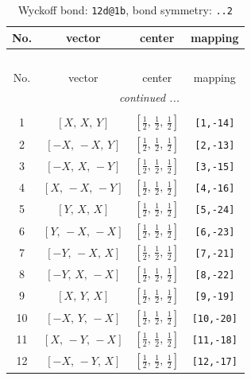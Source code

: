 \documentclass[fleqn,8pt]{jsarticle}
\begin{document}
\begin{longtable}{cccc}
\caption{Wyckoff bond: {\tt 12d@1b}, bond symmetry: {\tt ..2}}
 \\
 \hline \hline
No. & vector & center & mapping \\ \hline \endfirsthead

\multicolumn{3}{l}{\tablename\ \thetable{}} \\
 \hline \hline
No. & vector & center & mapping \\ \hline \endhead

 \hline \hline
\multicolumn{3}{r}{\footnotesize\it continued ...} \\ \endfoot

 \hline \hline
\multicolumn{3}{r}{} \\ \endlastfoot

1 & $\left[ X,\, X,\, Y \right]$ & $\left[ \frac{1}{2},\, \frac{1}{2},\, \frac{1}{2} \right]$ & {\tt [1,-14]} \\ \hline
2 & $\left[ - X,\, - X,\, Y \right]$ & $\left[ \frac{1}{2},\, \frac{1}{2},\, \frac{1}{2} \right]$ & {\tt [2,-13]} \\ \hline
3 & $\left[ - X,\, X,\, - Y \right]$ & $\left[ \frac{1}{2},\, \frac{1}{2},\, \frac{1}{2} \right]$ & {\tt [3,-15]} \\ \hline
4 & $\left[ X,\, - X,\, - Y \right]$ & $\left[ \frac{1}{2},\, \frac{1}{2},\, \frac{1}{2} \right]$ & {\tt [4,-16]} \\ \hline
5 & $\left[ Y,\, X,\, X \right]$ & $\left[ \frac{1}{2},\, \frac{1}{2},\, \frac{1}{2} \right]$ & {\tt [5,-24]} \\ \hline
6 & $\left[ Y,\, - X,\, - X \right]$ & $\left[ \frac{1}{2},\, \frac{1}{2},\, \frac{1}{2} \right]$ & {\tt [6,-23]} \\ \hline
7 & $\left[ - Y,\, - X,\, X \right]$ & $\left[ \frac{1}{2},\, \frac{1}{2},\, \frac{1}{2} \right]$ & {\tt [7,-21]} \\ \hline
8 & $\left[ - Y,\, X,\, - X \right]$ & $\left[ \frac{1}{2},\, \frac{1}{2},\, \frac{1}{2} \right]$ & {\tt [8,-22]} \\ \hline
9 & $\left[ X,\, Y,\, X \right]$ & $\left[ \frac{1}{2},\, \frac{1}{2},\, \frac{1}{2} \right]$ & {\tt [9,-19]} \\ \hline
10 & $\left[ - X,\, Y,\, - X \right]$ & $\left[ \frac{1}{2},\, \frac{1}{2},\, \frac{1}{2} \right]$ & {\tt [10,-20]} \\ \hline
11 & $\left[ X,\, - Y,\, - X \right]$ & $\left[ \frac{1}{2},\, \frac{1}{2},\, \frac{1}{2} \right]$ & {\tt [11,-18]} \\ \hline
12 & $\left[ - X,\, - Y,\, X \right]$ & $\left[ \frac{1}{2},\, \frac{1}{2},\, \frac{1}{2} \right]$ & {\tt [12,-17]} \\
\end{longtable}
\end{document}

